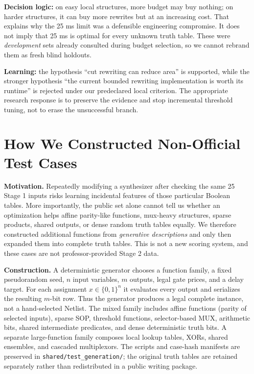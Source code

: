 \documentclass[a4paper,10pt]{article}
\theoremstyle{definition}
\theoremstyle{remark}
\begin{document}
\textbf{Decision logic:} on easy local structures, more budget may buy nothing; on harder structures, it can buy more rewrites but at an increasing cost. That explains why the 25 ms limit was a defensible engineering compromise. It does not imply that 25 ms is optimal for every unknown truth table. These were \emph{development} sets already consulted during budget selection, so we cannot rebrand them as fresh blind holdouts.

\begin{tcolorbox}[colback=ResearchRose!16,colframe=ResearchRose,title=Decision after Round 6.1: No-Go for automatic promotion]
\textbf{Learning:} the hypothesis ``cut rewriting can reduce area'' is supported, while the stronger hypothesis ``the current bounded rewriting implementation is worth its runtime'' is rejected under our predeclared local criterion. The appropriate research response is to preserve the evidence and stop incremental threshold tuning, not to erase the unsuccessful branch.
\end{tcolorbox}

\section{How We Constructed Non-Official Test Cases}
\textbf{Motivation.} Repeatedly modifying a synthesizer after checking the same 25 Stage 1 inputs risks learning incidental features of those particular Boolean tables. More importantly, the public set alone cannot tell us whether an optimization helps affine parity-like functions, mux-heavy structures, sparse products, shared outputs, or dense random truth tables equally. We therefore constructed additional functions from \emph{generative descriptions} and only then expanded them into complete truth tables. This is not a new scoring system, and these cases are not professor-provided Stage 2 data.

\textbf{Construction.} A deterministic generator chooses a function family, a fixed pseudorandom seed, $n$ input variables, $m$ outputs, legal gate prices, and a delay target. For each assignment $x\in\{0,1\}^n$ it evaluates every output and serializes the resulting $m$-bit row. Thus the generator produces a legal complete instance, not a hand-selected Netlist. The mixed family includes affine functions (parity of selected inputs), sparse SOP, threshold functions, selector-based MUX, arithmetic bits, shared intermediate predicates, and dense deterministic truth bits. A separate large-function family composes local lookup tables, XORs, shared ensembles, and cascaded multiplexors. The scripts and case-hash manifests are preserved in \texttt{shared/test\_generation/}; the original truth tables are retained separately rather than redistributed in a public writing package.
\end{document}
